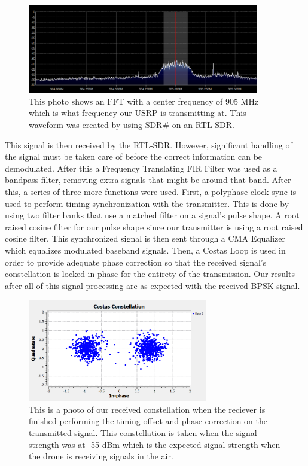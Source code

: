 \begin{figure}[h]
  \centering
  \includegraphics[width=0.9\textwidth]{img/rxspectrum.PNG}
  \caption{This photo shows an FFT with a center frequency of 905 MHz which is what frequency our USRP is transmitting at.  This waveform was created by using SDR\# on an RTL-SDR.}
  \label{fig:rxspectrum}
\end{figure}

This signal is then received by the RTL-SDR.  However, significant handling of the signal must be taken care of before the correct information can be demodulated. After this a Frequency Translating FIR Filter was used as a bandpass filter, removing extra signals that might be around that band. After this, a series of three more functions were used. First, a polyphase clock sync is used to perform timing synchronization with the transmitter. This is done by using two filter banks that use a matched filter on a signal’s pulse shape. A root raised cosine filter for our pulse shape since our transmitter is using a root raised cosine filter. This synchronized signal is then sent through a CMA Equalizer which equalizes modulated baseband signals. Then, a Costas Loop is used in order to provide adequate phase correction so that the received signal's constellation is locked in phase for the entirety of the transmission.  Our results after all of this signal processing are as expected with the received BPSK signal. 

\begin{figure}[h]
  \centering
  \includegraphics[width=0.70\textwidth]{img/constellation.PNG}
  \caption{This is a photo of our received constellation when the reciever is finished performing the timing offset and phase correction on the transmitted signal.  This constellation is taken when the signal strength was at -55 dBm which is the expected signal strength when the drone is receiving signals in the air.}
  \label{fig:constellation}
\end{figure}

